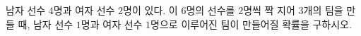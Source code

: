 남자 선수 $4$명과 여자 선수 $2$명이 있다. 이 $6$명의 선수를 $2$명씩 짝 지어 $3$개의 팀을 만들 때, 남자 선수 $1$명과 여자 선수 $1$명으로 이루어진 팀이 만들어질 확률을 구하시오.
